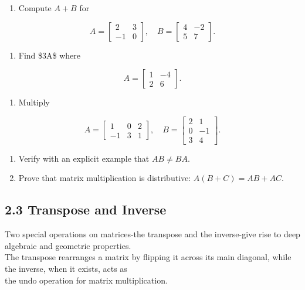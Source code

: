 \documentclass[
  12pt,
  a4paper,
]{article}
\begin{document}
\begin{enumerate}
\def\labelenumi{\arabic{enumi}.}
\item
  Compute \(A+B\) for
\end{enumerate}

\[A = \begin{bmatrix} 2 & 3 \\
-1 & 0 \end{bmatrix}, \quad
B = \begin{bmatrix} 4 & -2 \\
5 & 7 \end{bmatrix}.\]

\begin{enumerate}
\def\labelenumi{\arabic{enumi}.}
\item
  Find \$3A\$ where
\end{enumerate}

\[A = \begin{bmatrix} 1 & -4 \\
2 & 6 \end{bmatrix}.\]

\begin{enumerate}
\def\labelenumi{\arabic{enumi}.}
\item
  Multiply
\end{enumerate}

\[A = \begin{bmatrix} 1 & 0 & 2 \\
-1 & 3 & 1 \end{bmatrix}, \quad
B = \begin{bmatrix} 2 & 1 \\
0 & -1 \\
3 & 4 \end{bmatrix}.\]

\begin{enumerate}
\def\labelenumi{\arabic{enumi}.}
\item
  Verify with an explicit example that \(AB \neq BA\).
\item
  Prove that matrix multiplication is distributive:
  \(A(B+C) = AB + AC\).
\end{enumerate}

\subsection{2.3 Transpose and Inverse}\label{23-transpose-and-inverse}

Two special operations on matrices-the transpose and the inverse-give
rise to deep algebraic and geometric properties.\\
The transpose rearranges a matrix by flipping it across its main
diagonal, while the inverse, when it exists, acts as\\
the undo operation for matrix multiplication.
\end{document}
